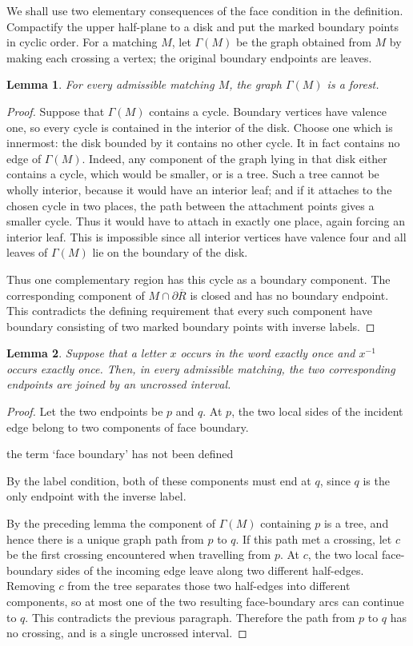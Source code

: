 \documentclass[12pt]{article}
\newtheorem{lemma}{Lemma}
\newcommand{\review}[1]{\begin{reviewbox}#1\end{reviewbox}}
\begin{document}
We shall use two elementary consequences of the face condition in the
definition.  Compactify the upper half-plane to a disk and put the
marked boundary points in cyclic order.  For a matching \(M\), let
\(\Gamma(M)\) be the graph obtained from \(M\) by making each crossing a
vertex; the original boundary endpoints are leaves.

\begin{lemma}
For every admissible matching \(M\), the graph \(\Gamma(M)\) is a
forest.
\end{lemma}

\begin{proof}
Suppose that \(\Gamma(M)\) contains a cycle.  Boundary vertices have
valence one, so every cycle is contained in the interior of the disk.
Choose one which is innermost: the disk bounded by it contains no other
cycle.  It in fact contains no edge of \(\Gamma(M)\).  Indeed, any
component of the graph lying in that disk either contains a cycle, which
would be smaller, or is a tree.  Such a tree cannot be wholly interior,
because it would have an interior leaf; and if it attaches to the chosen
cycle in two places, the path between the attachment points gives a
smaller cycle.  Thus it would have to attach in exactly one place, again
forcing an interior leaf.  This is impossible since all interior vertices
have valence four and all leaves of \(\Gamma(M)\) lie on the boundary of
the disk.

Thus one complementary region has this cycle as a boundary component.
The corresponding component of
\(M\cap\partial\overline R\) is closed and has no boundary endpoint.
This contradicts the defining requirement that every such component
have boundary consisting of two marked boundary points with inverse
labels.
\end{proof}

\begin{lemma}
Suppose that a letter \(x\) occurs in the word exactly once and
\(x^{-1}\) occurs exactly once.  Then, in every admissible matching, the
two corresponding endpoints are joined by an uncrossed interval.
\end{lemma}

\begin{proof}
Let the two endpoints be \(p\) and \(q\).  At \(p\), the two local sides
of the incident edge belong to two components of face boundary.\review{the term `face boundary' has not been defined}  By the
label condition, both of these components must end at \(q\), since
\(q\) is the only endpoint with the inverse label.

By the preceding lemma the component of \(\Gamma(M)\) containing \(p\)
is a tree, and hence there is a unique graph path from \(p\) to \(q\).
If this path met a crossing, let \(c\) be the first crossing encountered
when travelling from \(p\).  At \(c\), the two local face-boundary sides
of the incoming edge leave along two different half-edges.  Removing
\(c\) from the tree separates those two half-edges into different
components, so at most one of the two resulting face-boundary arcs can
continue to \(q\).  This contradicts the previous paragraph.  Therefore
the path from \(p\) to \(q\) has no crossing, and is a single uncrossed
interval.
\end{proof}
\end{document}
